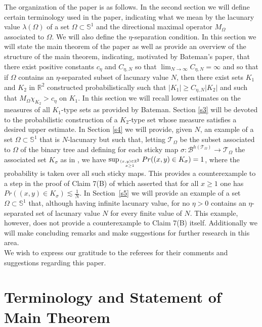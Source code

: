 \documentclass[12pt]{amsart}
\numberwithin{equation}{section}
\theoremstyle{definition}
\theoremstyle{remark}
\begin{document}
The organization of the paper is as follows.   In the second section we will define certain terminology used in the paper, indicating what we mean by the lacunary value $\lambda(\Omega)$ of a set \mbox{$\Omega \subset \mathbb{S}^{1}$}  and the directional maximal operator $M_\Omega$ associated to $\Omega$.   We will also define the $\eta$-separation condition. In this section we will state the main theorem of the paper as well as provide an overview of the structure of the main theorem, indicating, motivated by Bateman's paper, that  there exist positive constants $c_{\eta}$ and $C_{\eta, N}$ so that $\lim_{N \rightarrow \infty}C_{\eta, N} = \infty$ and so that if $\Omega$ contains an $\eta$-separated subset of lacunary value $N$, then there exist sets $K_1$ and $K_2$ in $\mathbb{R}^2$  constructed probabilistically such that $|K_1| \geq C_{\eta, N}|K_2|$ and such that $M_\Omega \chi_{K_2} > c_{\eta}$ on $K_1$.  In this section we will recall lower estimates on the measures of all  $K_1$-type sets as provided by Bateman.     Section \ref{s3} will be devoted to the probabilistic construction of a $K_2$-type set whose measure satisfies a desired upper estimate. In Section \ref{s4} we will provide, given $N$, an example of a set  $\Omega \subset \mathbb{S}^1$ that is $N$-lacunary  but such that, letting $\mathscr{T}_{\Omega}$  be the subset associated to $\Omega$ of the binary tree and defining for each sticky map $\sigma: \mathscr{B}^{h(\mathscr{T}_\Omega)} \rightarrow \mathscr{T}_\Omega$ the associated set $K_\sigma$ as in \cite{Ba}, we have $\sup_{(x,y) \in \mathbb{R}^2 \atop {x \geq 1}} Pr((x,y) \in K_\sigma) = 1 $, where the probability is taken over all such sticky maps.   This provides a counterexample to a step in the proof of  Claim 7(B) of \cite{Ba} which asserted that for all $x \geq 1$ one has $Pr((x,y) \in K_\sigma) \lesssim \frac{1}{N}$.  In \mbox{Section \ref{s5}} we will provide an example of a set $\Omega \subset \mathbb{S}^1$ that, although having infinite lacunary value,  for no $\eta > 0$  contains an $\eta$-separated set of lacunary value $N$  for every finite value of $N$.   This example, however, does not provide a counterexample to Claim 7(B) itself.  Additionally we will make concluding remarks and make suggestions for further research in this area.
\\

We wish to express our gratitude to the referees for their comments and suggestions regarding this paper.
\section{Terminology and Statement of Main Theorem}\label{s2}
\end{document}
